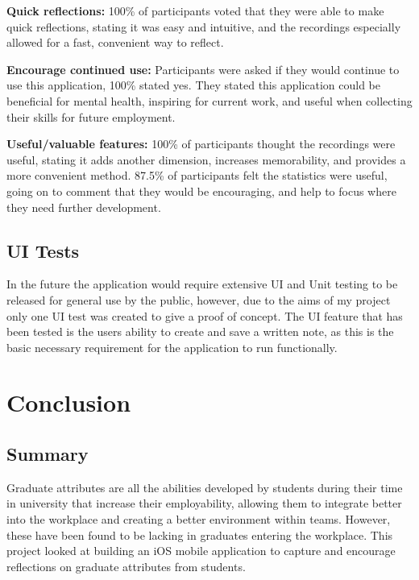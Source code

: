 \documentclass{l4proj}
\begin{document}
\textbf{Quick reflections:} 100\% of participants voted that they were able to make quick reflections, stating it was easy and intuitive, and the recordings especially allowed for a fast, convenient way to reflect.

\textbf{Encourage continued use:} Participants were asked if they would continue to use this application, 100\% stated yes. They stated this application could be beneficial for mental health, inspiring for current work, and useful when collecting their skills for future employment. 

\textbf{Useful/valuable features:} 100\% of participants thought the recordings were useful, stating it adds another dimension, increases memorability, and provides a more convenient method. 87.5\% of participants felt the statistics were useful, going on to comment that they would be encouraging, and help to focus where they need further development.


\section{UI Tests}

In the future the application would require extensive UI and Unit testing to be released for general use by the public, however, due to the aims of my project only one UI test was created to give a proof of concept. The UI feature that has been tested is the users ability to create and save a written note, as this is the basic necessary requirement for the application to run functionally. 


\chapter{Conclusion}  

\section{Summary}

Graduate attributes are all the abilities developed by students during their time in university that increase their employability, allowing them to integrate better into the workplace and creating a better environment within teams. However, these have been found to be lacking in graduates entering the workplace. This project looked at building an iOS mobile application to capture and encourage reflections on graduate attributes from students. 
\end{document}
